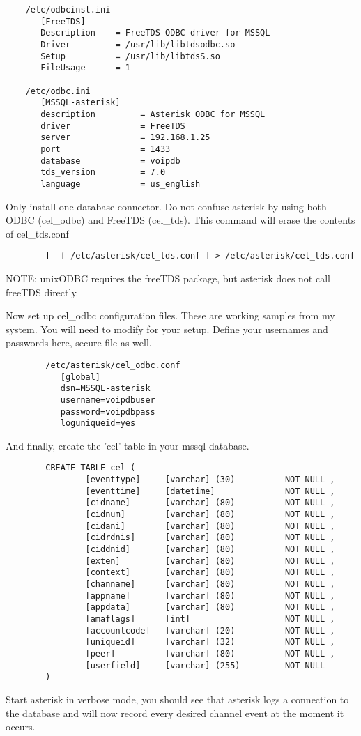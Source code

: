 \begin{verbatim}
	/etc/odbcinst.ini
	   [FreeTDS]
	   Description    = FreeTDS ODBC driver for MSSQL
	   Driver         = /usr/lib/libtdsodbc.so
	   Setup          = /usr/lib/libtdsS.so
	   FileUsage      = 1

	/etc/odbc.ini
	   [MSSQL-asterisk]
	   description         = Asterisk ODBC for MSSQL
	   driver              = FreeTDS
	   server              = 192.168.1.25
	   port                = 1433
	   database            = voipdb
	   tds_version         = 7.0
	   language            = us_english
\end{verbatim}

		Only install one database connector.  Do not confuse asterisk
		by using both ODBC (cel\_odbc) and FreeTDS (cel\_tds).
		This command will erase the contents of cel\_tds.conf 
\begin{verbatim}
		[ -f /etc/asterisk/cel_tds.conf ] > /etc/asterisk/cel_tds.conf
\end{verbatim}
		NOTE:  unixODBC requires the freeTDS package, but asterisk does
		not call freeTDS directly.

		Now set up cel\_odbc configuration files.  These are working samples
		from my system.  You will need to modify for your setup. Define
		your usernames and passwords here, secure file as well.
\begin{verbatim}
		/etc/asterisk/cel_odbc.conf
		   [global]
		   dsn=MSSQL-asterisk
		   username=voipdbuser
		   password=voipdbpass
		   loguniqueid=yes
\end{verbatim}
		And finally, create the 'cel' table in your mssql database.
\begin{verbatim}
		CREATE TABLE cel (
				[eventtype]     [varchar] (30)          NOT NULL ,
		        [eventtime]     [datetime]              NOT NULL ,
		        [cidname]       [varchar] (80)          NOT NULL ,
		        [cidnum]        [varchar] (80)          NOT NULL ,
		        [cidani]        [varchar] (80)          NOT NULL ,
		        [cidrdnis]      [varchar] (80)          NOT NULL ,
		        [ciddnid]       [varchar] (80)          NOT NULL ,
		        [exten]         [varchar] (80)          NOT NULL ,
		        [context]       [varchar] (80)          NOT NULL ,
		        [channame]      [varchar] (80)          NOT NULL ,
		        [appname]       [varchar] (80)          NOT NULL ,
		        [appdata]       [varchar] (80)          NOT NULL ,
		        [amaflags]      [int]                   NOT NULL ,
		        [accountcode]   [varchar] (20)          NOT NULL ,
		        [uniqueid]      [varchar] (32)          NOT NULL ,
		        [peer]          [varchar] (80)          NOT NULL ,
		        [userfield]     [varchar] (255)         NOT NULL
		)
\end{verbatim}
		Start asterisk in verbose mode, you should see that asterisk
		logs a connection to the database and will now record every
		desired channel event at the moment it occurs.

